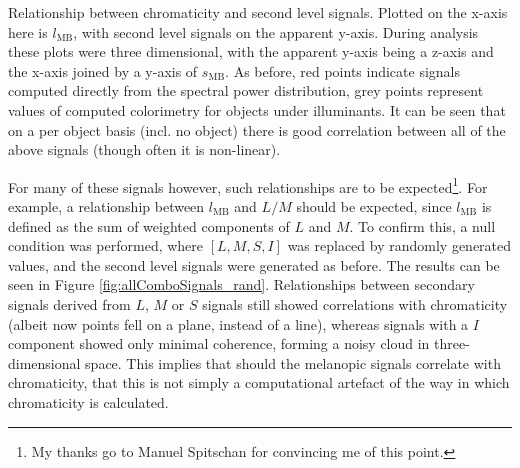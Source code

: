 \begin{fullpagefigure}
\caption{Relationship between chromaticity and second level signals. Plotted on the x-axis here is $l_{\text{MB}}$, with second level signals on the apparent y-axis. During analysis these plots were three dimensional, with the apparent y-axis being a z-axis and the x-axis joined by a y-axis of $s_{\text{MB}}$. As before, red points indicate signals computed directly from the spectral power distribution, grey points represent values of computed colorimetry for objects under illuminants. It can be seen that on a per object basis (incl. no object) there is good correlation between all of the above signals (though often it is non-linear).}
\label{fig:allComboSignals}
\end{fullpagefigure}

For many of these signals however, such relationships are to be expected\footnote{My thanks go to Manuel Spitschan for convincing me of this point.}. For example, a relationship between $l_{\text{MB}}$ and $L/M$ should be expected, since $l_{\text{MB}}$ is defined as the sum of weighted components of $L$ and $M$. To confirm this, a null condition was performed, where $[L,M,S,I]$ was replaced by randomly generated values, and the second level signals were generated as before. The results can be seen in Figure \ref{fig:allComboSignals_rand}. Relationships between secondary signals derived from $L$, $M$ or $S$ signals still showed correlations with chromaticity (albeit now points fell on a plane, instead of a line), whereas signals with a $I$ component showed only minimal coherence, forming a noisy cloud in three-dimensional space. This implies that should the melanopic signals correlate with chromaticity, that this is not simply a computational artefact of the way in which chromaticity is calculated.

% 



